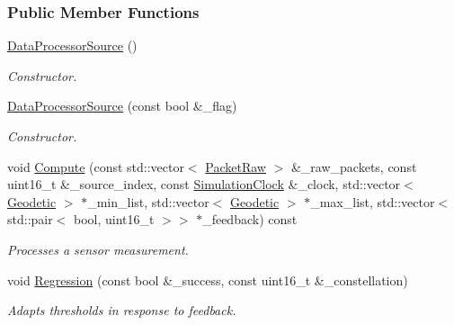 \subsubsection*{Public Member Functions}
\begin{DoxyCompactItemize}
\item 
\mbox{\label{classosse_1_1collaborate_1_1_data_processor_source_abda2d1b8e2939b332b1690ea1bbd2e21}} 
\hyperlink{classosse_1_1collaborate_1_1_data_processor_source_abda2d1b8e2939b332b1690ea1bbd2e21}{Data\+Processor\+Source} ()
\begin{DoxyCompactList}\small\item\em Constructor. \end{DoxyCompactList}\item 
\mbox{\label{classosse_1_1collaborate_1_1_data_processor_source_af72b963c9cbf47f265e5f8deb4ec098f}} 
\hyperlink{classosse_1_1collaborate_1_1_data_processor_source_af72b963c9cbf47f265e5f8deb4ec098f}{Data\+Processor\+Source} (const bool \&\+\_\+flag)
\begin{DoxyCompactList}\small\item\em Constructor. \end{DoxyCompactList}\item 
void \hyperlink{classosse_1_1collaborate_1_1_data_processor_source_a625d453c95bf1491290afdd0b85d4681}{Compute} (const std\+::vector$<$ \hyperlink{classosse_1_1collaborate_1_1_packet_raw}{Packet\+Raw} $>$ \&\+\_\+raw\+\_\+packets, const uint16\+\_\+t \&\+\_\+source\+\_\+index, const \hyperlink{classosse_1_1collaborate_1_1_simulation_clock}{Simulation\+Clock} \&\+\_\+clock, std\+::vector$<$ \hyperlink{classosse_1_1collaborate_1_1_geodetic}{Geodetic} $>$ $\ast$\+\_\+min\+\_\+list, std\+::vector$<$ \hyperlink{classosse_1_1collaborate_1_1_geodetic}{Geodetic} $>$ $\ast$\+\_\+max\+\_\+list, std\+::vector$<$ std\+::pair$<$ bool, uint16\+\_\+t $>$$>$ $\ast$\+\_\+feedback) const
\begin{DoxyCompactList}\small\item\em Processes a sensor measurement. \end{DoxyCompactList}\item 
void \hyperlink{classosse_1_1collaborate_1_1_data_processor_source_ae9b24ff12942f0c667064a349d12fa9b}{Regression} (const bool \&\+\_\+success, const uint16\+\_\+t \&\+\_\+constellation)
\begin{DoxyCompactList}\small\item\em Adapts thresholds in response to feedback. \end{DoxyCompactList}\end{DoxyCompactItemize}
